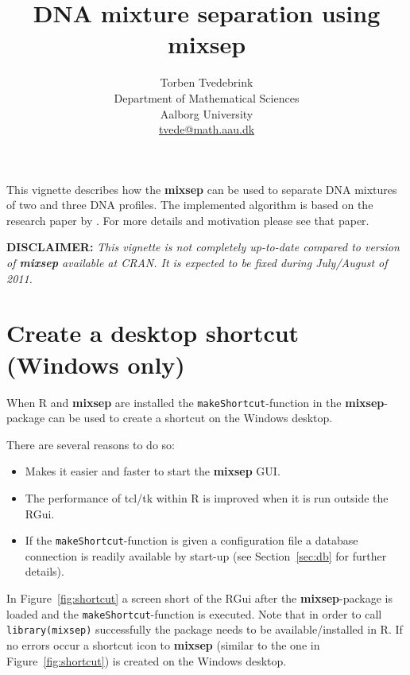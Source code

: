 \documentclass[a4paper,11pt]{article}
\newcommand{\code}[1]{\texttt{#1}}
\newcommand{\pkg}[1]{\textbf{#1}}
\begin{document}


\title{DNA mixture separation using \pkg{mixsep}}
\author{Torben Tvedebrink\\
  Department of Mathematical Sciences\\ Aalborg University\\
  \url{tvede@math.aau.dk}
}
\maketitle
\sloppy

\noindent This vignette describes how the \pkg{mixsep} can be used to
separate DNA mixtures of two and three DNA profiles. The implemented
algorithm is based on the research paper by \cite{tvedebrink2011}. For
more details and motivation please see that paper. 

\textbf{DISCLAIMER:} \textsl{This vignette is not completely
  up-to-date compared to version of \pkg{mixsep} available at CRAN. It
  is expected to be fixed during July/August of 2011.}

\section{Create a desktop shortcut (Windows only)}
\label{sec:shortcut}

When \textsf{R} and \pkg{mixsep} are installed the
\code{makeShortcut}-function in the \pkg{mixsep}-package can be used
to create a shortcut on the Windows desktop. 

There are several reasons to do so: 
\begin{itemize}
\item Makes it easier and faster to start the \pkg{mixsep} GUI.
\item The performance of tcl/tk within R is improved when it is run
  outside the RGui.
\item If the \code{makeShortcut}-function is given a configuration
  file a database connection is readily available by start-up (see
  Section~\ref{sec:db} for further details).
\end{itemize}

In Figure~\ref{fig:shortcut} a screen short of the RGui after the
\pkg{mixsep}-package is loaded and the \code{makeShortcut}-function is
executed. Note that in order to call \code{library(mixsep)}
successfully the package needs to be available/installed in
\textsf{R}. If no errors occur a shortcut icon to \pkg{mixsep}
(similar to the one in Figure~\ref{fig:shortcut}) is created on the
Windows desktop.
\end{document}
